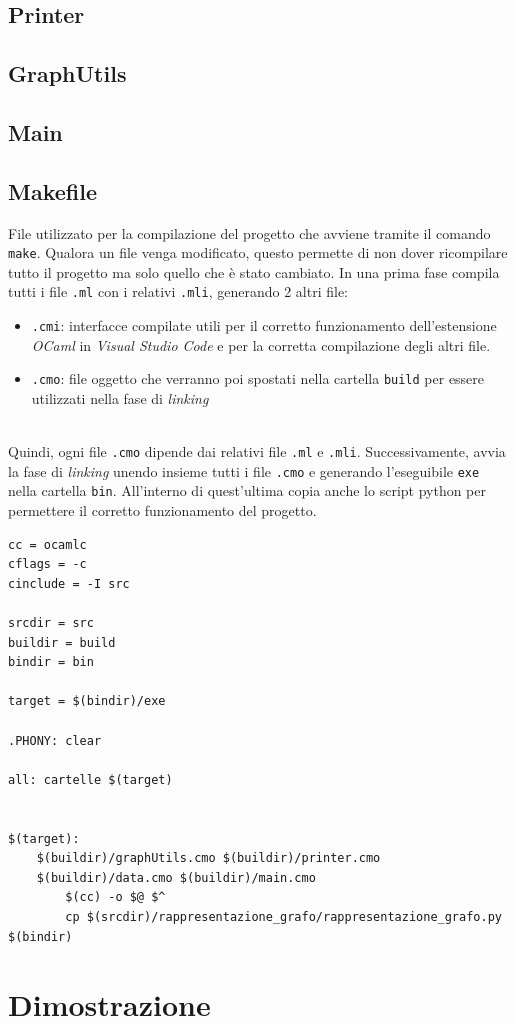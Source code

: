 \subsection{Printer}

\subsection{GraphUtils}

\subsection{Main}

\subsection{Makefile}

File utilizzato per la compilazione del progetto che avviene tramite il comando \lstinline[style=cmd]|make|. 
Qualora un file venga modificato, questo permette di non dover ricompilare tutto il progetto ma solo quello che è stato cambiato. In una prima fase compila tutti i file \lstinline[style=cmd]|.ml| con i relativi \lstinline[style=cmd]|.mli|, generando 2 altri file:

\begin{itemize}
	\item \lstinline[style=cmd]|.cmi|: interfacce compilate utili per il corretto funzionamento dell'estensione \textit{OCaml} in \textit{Visual Studio Code} e per la corretta compilazione degli altri file.
	\item \lstinline[style=cmd]|.cmo|: file oggetto che verranno poi spostati nella cartella \lstinline[style=cmd]|build| per essere utilizzati nella fase di \textit{linking}
\end{itemize}
\ \\
Quindi, ogni file \lstinline[style=cmd]|.cmo| dipende dai relativi file \lstinline[style=cmd]|.ml| e \lstinline[style=cmd]|.mli|.
Successivamente, avvia la fase di \textit{linking} unendo insieme tutti i file \lstinline[style=cmd]|.cmo| e generando l'eseguibile \lstinline[style=cmd]|exe| nella cartella \lstinline[style=cmd]|bin|. All'interno di quest'ultima copia anche lo script python per permettere il corretto funzionamento del progetto.

\begin{lstlisting}[style=make, caption={Breve estratto del file Makefile}]
cc = ocamlc
cflags = -c
cinclude = -I src

srcdir = src
buildir = build
bindir = bin

target = $(bindir)/exe

.PHONY: clear

all: cartelle $(target)


$(target): 
	$(buildir)/graphUtils.cmo $(buildir)/printer.cmo 
	$(buildir)/data.cmo $(buildir)/main.cmo
		$(cc) -o $@ $^
		cp $(srcdir)/rappresentazione_grafo/rappresentazione_grafo.py $(bindir)

\end{lstlisting}
\section{Dimostrazione}





